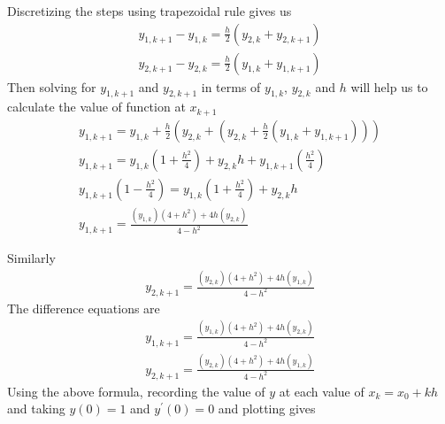 \documentclass{beamer}
\providecommand{\brak}[1]{\ensuremath{\left(#1\right)}}
\theoremstyle{remark}
\numberwithin{equation}{section}
\begin{document}
\begin{frame}
Discretizing the steps using trapezoidal rule gives us
\begin{align}
	y_{1,k+1} - y_{1,k} = \frac{h}{2}\brak{y_{2,k}+y_{2,k+1}}\\
	y_{2,k+1} - y_{2,k} = \frac{h}{2}\brak{y_{1,k}+y_{1,k+1}}
\end{align}
Then solving for $y_{1,k+1}$ and $y_{2,k+1}$ in terms of $y_{1,k}$, $y_{2,k}$ and $h$ will help us to calculate the value of function at $x_{k+1}$
\begin{align}
	y_{1,k+1} = y_{1,k} + \frac{h}{2}\brak{y_{2,k}+\brak{y_{2,k}+\frac{h}{2}\brak{y_{1,k}+y_{1,k+1}}}}\\
	y_{1,k+1} = y_{1,k}\brak{1+\frac{h^2}{4}} + y_{2,k}h + y_{1,k+1}\brak{\frac{h^2}{4}}\\
	y_{1,k+1}\brak{1-\frac{h^2}{4}} = y_{1,k}\brak{1+\frac{h^2}{4}} + y_{2,k}h\\
	y_{1,k+1} = \frac{\brak{y_{1,k}}\brak{4+h^2}+4h\brak{y_{2,k}}}{4-h^2}
\end{align}
\end{frame}
\begin{frame}
Similarly
\begin{align}
y_{2,k+1} = \frac{\brak{y_{2,k}}\brak{4+h^2}+4h\brak{y_{1,k}}}{4-h^2}
\end{align}
The difference equations are
\begin{align}
y_{1,k+1} = \frac{\brak{y_{1,k}}\brak{4+h^2}+4h\brak{y_{2,k}}}{4-h^2}\\
y_{2,k+1} = \frac{\brak{y_{2,k}}\brak{4+h^2}+4h\brak{y_{1,k}}}{4-h^2}
\end{align}
Using the above formula, recording the value of $y$ at each value of $x_{k} = x_0 + kh$ and taking $y\brak{0} = 1$ and $y^\prime\brak{0}=0$ and plotting gives
\end{frame}
\end{document}
